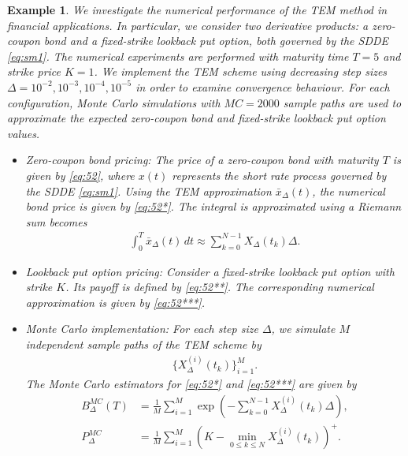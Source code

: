 \documentclass[11pt]{article}
\newtheorem{example}[definition]{Example}
\begin{document}
\begin{example}
We investigate the numerical performance of the TEM method in financial applications. In particular, we consider two derivative products: a zero-coupon bond and a fixed-strike lookback put option, both governed by the SDDE \eqref{eq:sm1}. The numerical experiments are performed with maturity time $T = 5$ and strike price $K = 1$. We implement the TEM scheme using decreasing step sizes $\Delta = 10^{-2}, 10^{-3}, 10^{-4}, 10^{-5}$ in order to examine convergence behaviour. For each configuration, Monte Carlo simulations with $MC = 2000$ sample paths are used to approximate the expected zero-coupon bond and fixed-strike lookback put option values.

\begin{itemize}
\item Zero-coupon bond pricing: The price of a zero-coupon bond with maturity $T$ is given by \eqref{eq:52}, where $x(t)$ represents the short rate process governed by the SDDE \eqref{eq:sm1}. Using the TEM approximation $\bar{x}_{\Delta}(t)$, the numerical bond price is given by \eqref{eq:52*}. The integral is approximated using a Riemann sum becomes
\begin{align*}
\int_0^T \bar{x}_{\Delta}(t)\,dt \approx \sum_{k=0}^{N-1} X_{\Delta}(t_k)\Delta.
\end{align*}
\item Lookback put option pricing: Consider a fixed-strike lookback put option with strike $K$. Its payoff is defined by \eqref{eq:52**}. The corresponding numerical approximation is given by \eqref{eq:52***}.
\item Monte Carlo implementation: For each step size $\Delta$, we simulate $M$ independent sample paths of the TEM scheme by
\begin{align*}
\{X_{\Delta}^{(i)}(t_k)\}_{i=1}^M.
\end{align*}
The Monte Carlo estimators for \eqref{eq:52*} and \eqref{eq:52***} are given by
\begin{align*}
B_{\Delta}^{MC}(T) &= \frac{1}{M} \sum_{i=1}^M 
\exp\left(-\sum_{k=0}^{N-1} X_{\Delta}^{(i)}(t_k)\Delta\right), \\
P_{\Delta}^{MC} &= \frac{1}{M} \sum_{i=1}^M 
\left(K - \min_{0 \le k \le N} X_{\Delta}^{(i)}(t_k)\right)^+.
\end{align*}

\end{itemize}
\end{example}
\end{document}
